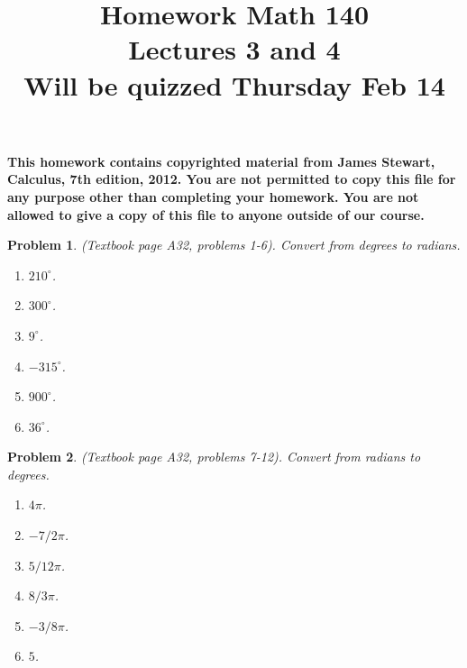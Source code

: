 \documentclass{article}
\date{}
\title{
Homework Math 140 \\
Lectures 3 and 4 \\
Will be quizzed Thursday Feb 14
}
\newtheorem{problem}{Problem}
\begin{document}
\maketitle
\textbf{This homework contains copyrighted material from  James Stewart, Calculus, 7th edition, 2012. 
You are not permitted to copy this file for any purpose other than completing your homework. You are not allowed to give a copy of this file to anyone outside of our course. 
}

\begin{problem} (Textbook page A32, problems 1-6). 
Convert from degrees to radians.
\begin{multicols}{2}
\begin{enumerate}
\item $210^\circ$.
\item $300^\circ$.
\item $9^\circ$.
\item $-315^\circ$.
\item $900^\circ$.
\item $36^\circ$.
\end{enumerate}
\end{multicols}
\end{problem}
\begin{problem} (Textbook page A32, problems 7-12). 
Convert from radians to degrees.
\begin{multicols}{2}
\begin{enumerate}
\item $4\pi$.
\item $-7/2\pi$.
\item $5/12\pi$.
\item $8/3\pi$.
\item $-3/8\pi$.
\item $5$.
\end{enumerate}
\end{multicols}
\end{problem}
\end{document}
